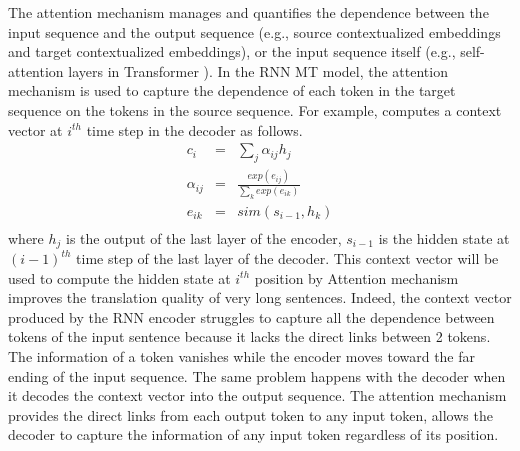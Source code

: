 The attention mechanism manages and quantifies the dependence between the input sequence and the output sequence (e.g., source contextualized embeddings and target contextualized embeddings), or the input sequence itself (e.g., self-attention layers in Transformer \citep{Vaswani17attention}). In the RNN MT model, the attention mechanism is used to capture the dependence of each token in the target sequence on the tokens in the source sequence. For example, \cite{Bahdanau15learning} computes a context vector at $i^{th}$ time step in the decoder as follows.
\begin{equation}
\begin{array}{rcl}
c_i &=& \sum_{j} \alpha_{ij} h_j \\
\alpha_{ij} &=& \frac{exp(e_{ij})}{\sum_{k}exp(e_{ik})} \\
e_{ik} &=& sim(s_{i-1},h_k)\\
\end{array}
\end{equation}
where $h_j$ is the output of the last layer of the encoder, $s_{i-1}$ is the hidden state at $(i-1)^{th}$ time step of the last layer of the  decoder. This context vector will be used to compute the hidden state at $i^{th}$ position by Attention mechanism improves the translation quality of very long sentences. Indeed, the context vector produced by the RNN encoder struggles to capture all the dependence between tokens  of the input sentence because it lacks the direct links between 2 tokens. The information of a token vanishes while the encoder moves toward the far ending of the input sequence. The same problem happens with the decoder when it decodes the context vector into the output sequence. The attention mechanism provides the direct links from each output token to any input token, allows the decoder to capture the information of any input token regardless of its position.

